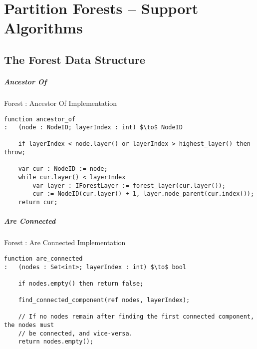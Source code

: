 \chapter{Partition Forests -- Support Algorithms}
\label{chap:appendixpf}

\section{The Forest Data Structure}

\paragraph{Ancestor Of}

\begin{stulisting}[H]
\caption{Forest : Ancestor Of Implementation}
\begin{lstlisting}[style=Default]
function ancestor_of
:	(node : NodeID; layerIndex : int) $\to$ NodeID

	if layerIndex < node.layer() or layerIndex > highest_layer() then throw;

	var cur : NodeID := node;
	while cur.layer() < layerIndex
		var layer : IForestLayer := forest_layer(cur.layer());
		cur := NodeID(cur.layer() + 1, layer.node_parent(cur.index());
	return cur;
\end{lstlisting}
\end{stulisting}

\paragraph{Are Connected}

\begin{stulisting}[H]
\caption{Forest : Are Connected Implementation}
\begin{lstlisting}[style=Default]
function are_connected
:	(nodes : Set<int>; layerIndex : int) $\to$ bool

	if nodes.empty() then return false;

	find_connected_component(ref nodes, layerIndex);

	// If no nodes remain after finding the first connected component, the nodes must
	// be connected, and vice-versa.
	return nodes.empty();
\end{lstlisting}
\end{stulisting}

